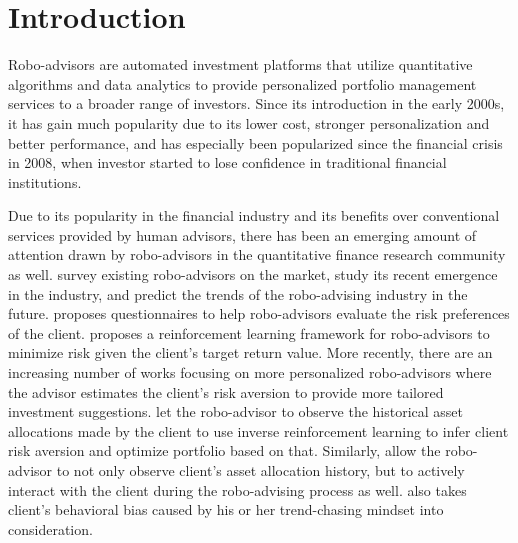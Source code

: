 \chapter{Introduction}

Robo-advisors are automated investment platforms that utilize quantitative algorithms and data analytics to provide personalized portfolio management services to a broader range of investors. Since its introduction in the early 2000s, it has gain much popularity due to its lower cost, stronger personalization and better performance, and has especially been popularized since the financial crisis in 2008, when investor started to lose confidence in traditional financial institutions.

Due to its popularity in the financial industry and its benefits over conventional services provided by human advisors, there has been an emerging amount of attention drawn by robo-advisors in the quantitative finance research community as well.  survey existing robo-advisors on the market, study its recent emergence in the industry, and predict the trends of the robo-advising industry in the future.  proposes questionnaires to help robo-advisors evaluate the risk preferences of the client.  proposes a reinforcement learning framework for robo-advisors to minimize risk given the client's target return value. More recently, there are an increasing number of works focusing on more personalized robo-advisors where the advisor estimates the client's risk aversion to provide more tailored investment suggestions.  let the robo-advisor to observe the historical asset allocations made by the client to use inverse reinforcement learning to infer client risk aversion and optimize portfolio based on that. Similarly,  allow the robo-advisor to not only observe client's asset allocation history, but to actively interact with the client during the robo-advising process as well.  also takes client's behavioral bias caused by his or her trend-chasing mindset into consideration.

